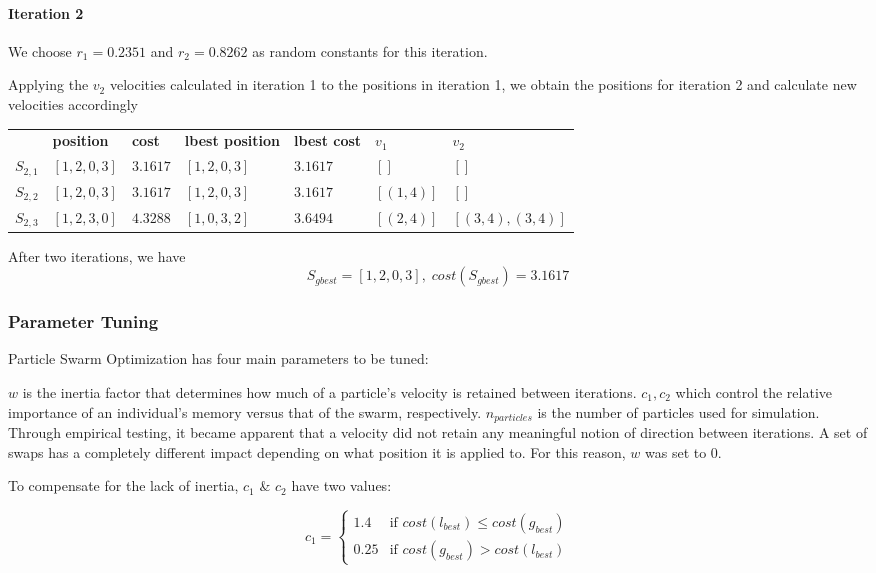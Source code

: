 \documentclass[a4paper]{article}
\newcommand{\subsubsubsection}[1]{\paragraph{#1} \mbox{}}
\begin{document}
\subsubsubsection{Iteration 2}

We choose $r_1 = 0.2351$ and $r_2 = 0.8262$ as random constants for this
iteration.

Applying the $v_2$ velocities calculated in iteration 1 to the positions in
iteration 1, we obtain the positions for iteration 2 and calculate new
velocities accordingly
\begin{center}
\begin{tabular}{lllllll}
          & \textbf{position} & \textbf{cost} & \textbf{lbest position} & \textbf{lbest cost} & $v_1$      & $v_2$            \\
$S_{2,1}$ & $[1, 2, 0, 3]$    & $3.1617$      & $[1, 2, 0, 3]$          & $3.1617$            & $[]      $ & $[]$             \\
$S_{2,2}$ & $[1, 2, 0, 3]$    & $3.1617$      & $[1, 2, 0, 3]$          & $3.1617$            & $[(1, 4)]$ & $[]$             \\
$S_{2,3}$ & $[1, 2, 3, 0]$    & $4.3288$      & $[1, 0, 3, 2]$          & $3.6494$            & $[(2, 4)]$ & $[(3,4), (3,4)]$ \\
\end{tabular}
\end{center}
\vspace{1.5em}

After two iterations, we have
$$S_\mathit{gbest} = [1, 2, 0, 3], \; cost(S_\mathit{gbest}) = 3.1617$$

\subsubsection{Parameter Tuning}
Particle Swarm Optimization has four main parameters to be tuned:

$w$ is the inertia factor that determines how much of a particle's velocity is retained between iterations. $c_1, c_2$ which control the relative importance of an individual's memory versus that of the swarm, respectively. $n_{particles}$ is the number of particles used for simulation.\\

Through empirical testing, it became apparent that a velocity did not retain any meaningful notion of direction between iterations. A set of swaps has a completely different impact depending on what position it is applied to. For this reason, $w$ was set to 0.

To compensate for the lack of inertia, $c_1$ \& $c_2$ have two values:

$$
c_1 =
\begin{cases}
1.4 & \text{if } \mathit{cost}(l_\mathit{best}) \leq \mathit{cost}(g_\mathit{best})\\
0.25 & \text{if } \mathit{cost}(g_\mathit{best}) > \mathit{cost}(l_\mathit{best})
\end{cases}
$$
\end{document}
